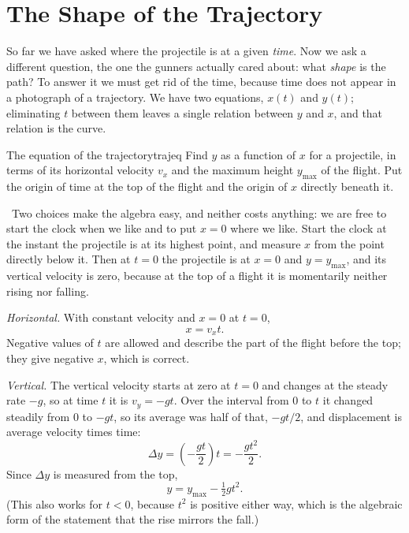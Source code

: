 \documentclass[11pt,twoside,openany]{book}
\newcommand{\viewtag}[3]{\fcolorbox{#2}{#3}{\footnotesize\textbf{\textcolor{#2}{#1}}}}
\newcommand{\elemtag}{\viewtag{Elementary}{elemcol}{elempale}}
\newcommand{\elem}{\par\medskip\noindent\elemtag\ }
\begin{document}
\section{The Shape of the Trajectory}
\label{sec:parabola}

So far we have asked where the projectile is at a given \emph{time}. Now we ask a different question, the one the gunners actually cared about: what \emph{shape} is the path? To answer it we must get rid of the time, because time does not appear in a photograph of a trajectory. We have two equations, $x(t)$ and $y(t)$; eliminating $t$ between them leaves a single relation between $y$ and $x$, and that relation is the curve.

\begin{example}{The equation of the trajectory}{trajeq}
Find $y$ as a function of $x$ for a projectile, in terms of its horizontal velocity $v_x$ and the maximum height $y_{\max}$ of the flight. Put the origin of time at the top of the flight and the origin of $x$ directly beneath it.

\elem Two choices make the algebra easy, and neither costs anything: we are free to start the clock when we like and to put $x = 0$ where we like. Start the clock at the instant the projectile is at its highest point, and measure $x$ from the point directly below it. Then at $t = 0$ the projectile is at $x = 0$ and $y = y_{\max}$, and its vertical velocity is zero, because at the top of a flight it is momentarily neither rising nor falling.

\emph{Horizontal.} With constant velocity and $x = 0$ at $t = 0$,
\begin{equation}
x = v_x t.
\label{eq:xoft}
\end{equation}
Negative values of $t$ are allowed and describe the part of the flight before the top; they give negative $x$, which is correct.

\emph{Vertical.} The vertical velocity starts at zero at $t = 0$ and changes at the steady rate $-g$, so at time $t$ it is $v_y = -gt$. Over the interval from $0$ to $t$ it changed steadily from $0$ to $-gt$, so its average was half of that, $-gt/2$, and displacement is average velocity times time:
\[
\Delta y = \left(-\frac{gt}{2}\right)t = -\frac{g t^2}{2} .
\]
Since $\Delta y$ is measured from the top,
\begin{equation}
y = y_{\max} - \tfrac12 g t^2 .
\label{eq:yoft}
\end{equation}
(This also works for $t < 0$, because $t^2$ is positive either way, which is the algebraic form of the statement that the rise mirrors the fall.)


\end{example}
\end{document}
